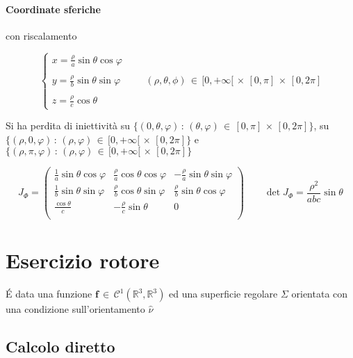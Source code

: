 \documentclass[10pt, oneside]{article}
\begin{document}
\paragraph{Coordinate sferiche} con riscalamento

\[\begin{cases} \displaystyle x = \frac{\rho}{a} \sin \theta \cos \varphi\\ \\
\displaystyle y = \frac{\rho}{b} \sin \theta \sin \varphi\\ \\
\displaystyle z = \frac{\rho}{c} \cos \theta
\end{cases}
\qquad (\rho, \theta, \phi) \, \in \, [0, +\infty[ \, \times \, [0, \pi] \, \times \, [0, 2\pi] \]

Si ha perdita di iniettività su $\{(0, \theta, \varphi) \, : \, (\theta, \varphi) \, \in \, [0, \pi] \, \times \, [0,2\pi]\}$, su $\{(\rho, 0, \varphi) \, : \, (\rho, \varphi) \, \in \, [0, +\infty[ \, \times \, [0,2\pi]\}$ e $\{(\rho, \pi, \varphi) \, : \, (\rho, \varphi) \, \in \, [0, +\infty[ \, \times \, [0,2\pi]\}$

\[J_\Phi = \begin{pmatrix}
\displaystyle \frac{1}{a} \sin \theta \cos \varphi & \displaystyle \frac{\rho}{a} \cos \theta \cos \varphi & \displaystyle - \frac{\rho}{a} \sin \theta \sin \varphi\\
\displaystyle \frac{1}{b} \sin \theta \sin \varphi & \displaystyle \frac{\rho}{b} \cos \theta \sin \varphi & \displaystyle \frac{\rho}{b} \sin \theta \cos \varphi\\
\displaystyle \frac{\cos \theta}{c} & \displaystyle - \frac{\rho}{c} \sin \theta & \displaystyle 0 \\
\end{pmatrix} \qquad \det J_\Phi = \frac{\rho^2}{abc} \sin \theta\]

\section{Esercizio rotore}

\'E data una funzione $\mathbf{f} \, \in \, \mathcal{C}^1(\mathbb{R}^3, \mathbb{R}^3)$ ed una superficie regolare $\Sigma$ orientata con una condizione sull'orientamento $\hat{\nu}$

\subsection{Calcolo diretto}
\end{document}
